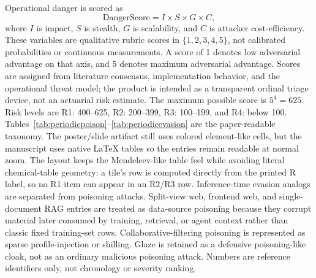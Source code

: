 \documentclass[conference]{IEEEtran}
\begin{document}
Operational danger is scored as
\begin{equation}
\mathrm{DangerScore}=I\times S\times G\times C,
\end{equation}
where \(I\) is impact, \(S\) is stealth, \(G\) is scalability, and \(C\) is attacker cost-efficiency. These variables are qualitative rubric scores in \(\{1,2,3,4,5\}\), not calibrated probabilities or continuous measurements. A score of 1 denotes low adversarial advantage on that axis, and 5 denotes maximum adversarial advantage. Scores are assigned from literature consensus, implementation behavior, and the operational threat model; the product is intended as a transparent ordinal triage device, not an actuarial risk estimate. The maximum possible score is \(5^4=625\). Risk levels are R1: 400--625, R2: 200--399, R3: 100--199, and R4: below 100. Tables~\ref{tab:periodicpoison}--\ref{tab:periodicevasion} are the paper-readable taxonomy. The poster/slide artifact still uses colored element-like cells, but the manuscript uses native \LaTeX{} tables so the entries remain readable at normal zoom. The layout keeps the Mendeleev-like table feel while avoiding literal chemical-table geometry: a tile's row is computed directly from the printed R label, so no R1 item can appear in an R2/R3 row. Inference-time evasion analogs are separated from poisoning attacks. Split-view web, frontend web, and single-document RAG entries are treated as data-source poisoning because they corrupt material later consumed by training, retrieval, or agent context rather than classic fixed training-set rows. Collaborative-filtering poisoning is represented as sparse profile-injection or shilling. Glaze is retained as a defensive poisoning-like cloak, not as an ordinary malicious poisoning attack. Numbers are reference identifiers only, not chronology or severity ranking.
\end{document}
